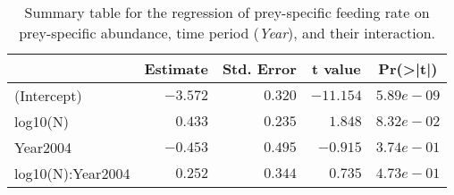 \begin{table}[!htbp]
\caption{Summary table for the regression of prey-specific feeding rate 
  on prey-specific abundance,
  time period (\emph{Year}), 
  and their interaction.\label{tab:FNYint}} 
\begin{center}
\begin{tabular}{lrrrr}
\hline
\multicolumn{1}{l}{}&\multicolumn{1}{c}{Estimate}&\multicolumn{1}{c}{Std. Error}&\multicolumn{1}{c}{t value}&\multicolumn{1}{c}{Pr(\textgreater |t|)}\tabularnewline
\hline
(Intercept)&$-3.572$&$0.320$&$-11.154$&$5.89e-09$\tabularnewline
log10(N)&$ 0.433$&$0.235$&$  1.848$&$8.32e-02$\tabularnewline
Year2004&$-0.453$&$0.495$&$ -0.915$&$3.74e-01$\tabularnewline
log10(N):Year2004&$ 0.252$&$0.344$&$  0.735$&$4.73e-01$\tabularnewline
\hline
\end{tabular}\end{center}
\end{table}
